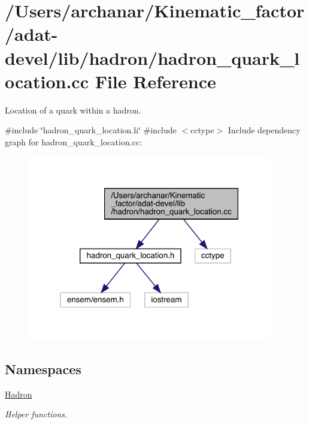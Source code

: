 \hypertarget{adat-devel_2lib_2hadron_2hadron__quark__location_8cc}{}\section{/\+Users/archanar/\+Kinematic\+\_\+factor/adat-\/devel/lib/hadron/hadron\+\_\+quark\+\_\+location.cc File Reference}
\label{adat-devel_2lib_2hadron_2hadron__quark__location_8cc}


Location of a quark within a hadron.  


{\ttfamily \#include \char`\"{}hadron\+\_\+quark\+\_\+location.\+h\char`\"{}}\newline
{\ttfamily \#include $<$cctype$>$}\newline
Include dependency graph for hadron\+\_\+quark\+\_\+location.\+cc\+:
\nopagebreak
\begin{figure}[H]
\begin{center}
\leavevmode
\includegraphics[width=302pt]{d5/deb/adat-devel_2lib_2hadron_2hadron__quark__location_8cc__incl}
\end{center}
\end{figure}
\subsection*{Namespaces}
\begin{DoxyCompactItemize}
\item 
 \mbox{\hyperlink{namespaceHadron}{Hadron}}
\begin{DoxyCompactList}\small\item\em Helper functions. \end{DoxyCompactList}\end{DoxyCompactItemize}
